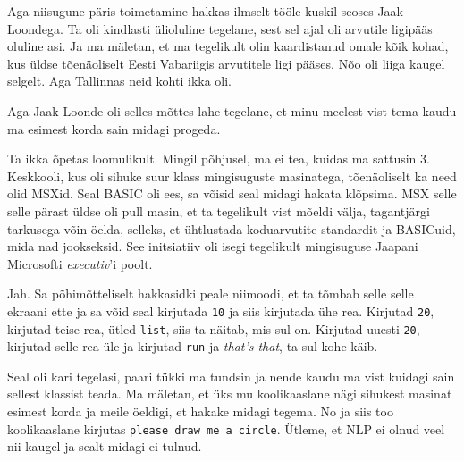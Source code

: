 Aga niisugune päris toimetamine hakkas ilmselt  tööle kuskil seoses Jaak Loondega. Ta oli kindlasti ülioluline tegelane, sest sel ajal oli arvutile ligipääs oluline asi. Ja ma mäletan, et ma tegelikult olin kaardistanud omale kõik kohad, kus üldse  tõenäoliselt Eesti Vabariigis arvutitele ligi pääses. Nõo oli liiga kaugel selgelt. Aga Tallinnas neid kohti ikka oli. 

Aga Jaak Loonde oli selles mõttes lahe tegelane, et minu meelest vist tema kaudu ma esimest korda sain midagi progeda. 


Ta ikka õpetas loomulikult. Mingil põhjusel, ma ei tea, kuidas ma sattusin  3. Keskkooli, kus oli sihuke suur klass mingisuguste masinatega, tõenäoliselt ka need olid MSXid. Seal BASIC oli ees, sa võisid seal midagi hakata klõpsima. MSX selle selle pärast  üldse oli pull masin, et  ta tegelikult vist mõeldi välja, tagantjärgi tarkusega võin öelda, selleks, et ühtlustada koduarvutite standardit ja BASICuid, mida nad jookseksid.  See initsiatiiv oli isegi tegelikult  mingisuguse Jaapani Microsofti \emph{executiv}'i poolt.


Jah. Sa põhimõtteliselt hakkasidki peale niimoodi, et ta tõmbab selle  selle ekraani ette ja sa võid seal kirjutada \verb|10| ja siis kirjutada ühe rea. Kirjutad \verb|20|, kirjutad teise rea, ütled \verb|list|, siis ta  näitab, mis sul on. Kirjutad uuesti \verb|20|, kirjutad selle rea üle ja kirjutad \verb|run| ja \emph{that's that}, ta sul kohe käib. 

Seal oli kari tegelasi, paari tükki ma tundsin ja nende kaudu ma vist kuidagi sain sellest klassist teada. Ma mäletan, et üks mu koolikaaslane nägi sihukest masinat esimest korda ja meile öeldigi, et hakake midagi tegema. No ja siis too koolikaaslane kirjutas \verb|please draw me a circle|. Ütleme, et NLP ei olnud veel nii kaugel ja sealt midagi ei tulnud.

